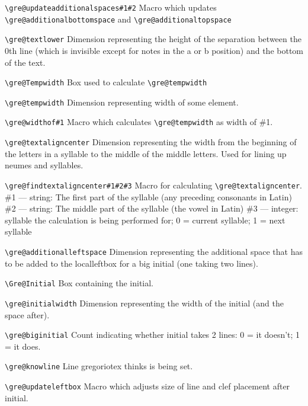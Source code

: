 \verb=\gre@updateadditionalspaces#1#2=%
	Macro which updates \verb=\gre@additionalbottomspace= and \verb=\gre@additionaltopspace=

\verb=\gre@textlower=%
	Dimension representing the height of the separation between the 0th line (which is invisible except for notes in the a or b position) and the bottom of the text.

\verb=\gre@Tempwidth=%
	Box used to calculate \verb=\gre@tempwidth=
	
\verb=\gre@tempwidth=%
	Dimension representing width of some element.

\verb=\gre@widthof#1=%
	Macro which calculates \verb=\gre@tempwidth= as width of \#1.

\verb=\gre@textaligncenter=%
	Dimension representing the width from the beginning of the letters in a syllable to the middle of the middle letters.  Used for lining up neumes and syllables.
	
\verb=\gre@findtextaligncenter#1#2#3=%
	Macro for calculating \verb=\gre@textaligncenter=.
	\#1 --- string: The first part of the syllable (any preceding consonants in Latin)
	\#2 --- string: The middle part of the syllable (the vowel in Latin)
	\#3 --- integer: syllable the calculation is being performed for; 0 = current syllable; 1 = next syllable

\verb=\gre@additionalleftspace=%
	Dimension representing the additional space that has to be added to the localleftbox for a big initial (one taking two lines).

\verb=\Gre@Initial=%
	Box containing the initial.

\verb=\gre@initialwidth=%
	Dimension representing the width of the initial (and the space after).

\verb=\gre@biginitial=%
	Count indicating whether initial takes 2 lines: 0 = it doesn't; 1 = it does.

\verb=\gre@knowline=%
	Line gregoriotex thinks is being set.

\verb=\gre@updateleftbox=%
	Macro which adjusts size of line and clef placement after initial.


